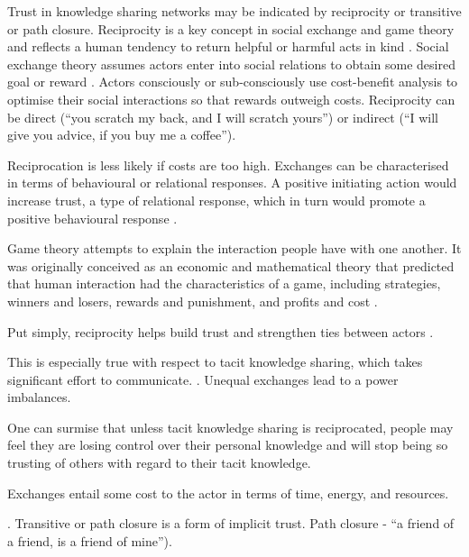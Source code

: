 Trust in knowledge sharing networks may be indicated by reciprocity or transitive or path closure. Reciprocity is a key concept in social exchange and game theory and reflects a human tendency to return helpful or harmful acts in kind  \citep{nowak2005evolution}. Social exchange theory assumes actors enter into social relations to obtain some desired goal or reward \citep{homans1961social,blau1964exchange}. Actors consciously or sub-consciously use cost-benefit analysis to optimise their social interactions so that rewards outweigh costs. Reciprocity can be direct (\enquote{you scratch my back, and I will scratch yours}) or indirect (\enquote{I will give you advice, if you buy me a coffee}).  


Reciprocation is less likely if costs are too high. Exchanges can be characterised in terms of behavioural or relational responses. A positive initiating action would increase trust, a type of relational response, which in turn would promote a positive behavioural response \citep{cropanzano2016social}. 

Game theory attempts to explain the interaction people have with one another. It was originally conceived as an economic and mathematical theory that predicted that human interaction had the characteristics of a game, including strategies, winners and losers, rewards and punishment, and profits and cost \citep{axel}. 


Put simply, reciprocity helps build trust and strengthen ties between actors \citep{blau1964exchange}. 


This is especially true with respect to tacit knowledge sharing, which takes significant effort to communicate.  . Unequal exchanges lead to a power imbalances. 

One can surmise that unless tacit knowledge sharing is reciprocated, people may feel they are losing control over their personal knowledge and will stop being so trusting of others with regard to their tacit knowledge. \medskip


Exchanges entail some cost to the actor in terms of time, energy, and resources.


. Transitive or path closure is a form of implicit trust. Path closure  - \enquote{a friend of a friend, is a friend of mine}). 



\medskip



